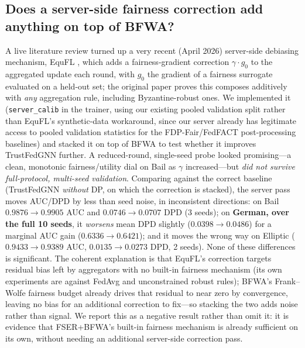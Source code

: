 \documentclass[pdflatex,sn-mathphys-num]{sn-jnl}
\theoremstyle{thmstyleone}%
\theoremstyle{thmstyletwo}%
\theoremstyle{thmstylethree}%
\begin{document}
\subsection{Does a server-side fairness correction add anything on top of BFWA?}
\label{sec:exp-equfl}
A live literature review turned up a very recent (April 2026) server-side
debiasing mechanism, EquFL \cite{yu2026equfl}, which adds a fairness-gradient
correction $\gamma\cdot g_0$ to the aggregated update each round, with $g_0$
the gradient of a fairness surrogate evaluated on a held-out set; the original
paper proves this composes additively with \emph{any} aggregation rule,
including Byzantine-robust ones. We implemented it (\texttt{server\_calib} in
the trainer, using our existing pooled validation split rather than EquFL's
synthetic-data workaround, since our server already has legitimate access to
pooled validation statistics for the FDP-Fair/FedFACT post-processing
baselines) and stacked it on top of BFWA to test whether it improves
TrustFedGNN further. A reduced-round, single-seed probe looked promising---a
clean, monotonic fairness/utility dial on Bail as $\gamma$ increased---but
\emph{did not survive full-protocol, multi-seed validation}. Comparing against
the correct baseline (TrustFedGNN \emph{without} DP, on which the correction is
stacked), the server pass moves AUC/DPD by less than seed noise, in inconsistent
directions: on Bail $0.9876{\to}0.9905$ AUC and $0.0746{\to}0.0707$ DPD (3 seeds);
on \textbf{German, over the full 10 seeds}, it \emph{worsens} mean DPD slightly
($0.0398{\to}0.0486$) for a marginal AUC gain ($0.6336{\to}0.6421$); and it moves
the wrong way on Elliptic ($0.9433{\to}0.9389$ AUC, $0.0135{\to}0.0273$ DPD,
2 seeds). None of these differences is significant. The coherent explanation is that
EquFL's correction targets residual bias left by aggregators with no built-in
fairness mechanism (its own experiments are against FedAvg and unconstrained
robust rules); BFWA's Frank--Wolfe fairness budget already drives that
residual to near zero by convergence, leaving no bias for an additional
correction to fix---so stacking the two adds noise rather than signal. We
report this as a negative result rather than omit it: it is evidence that
FSER+BFWA's built-in fairness mechanism is already sufficient on its own,
without needing an additional server-side correction pass.
\end{document}
